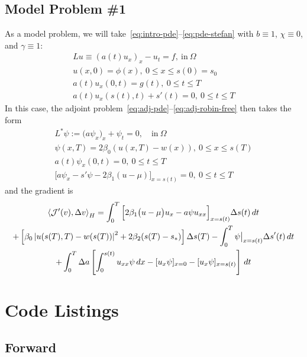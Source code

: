 \documentclass[letterpaper, 10pt]{amsart}
\theoremstyle{definition}
\theoremstyle{remark}
\newcommand{\lnorm}[1]{\left\vert #1\right\vert}%
\begin{document}
\subsection{Model Problem \#1}
As a model problem, we will take~\eqref{eq:intro-pde}--\eqref{eq:pde-stefan} with $b\equiv 1$, $\chi \equiv 0$, and $\gamma \equiv 1$:
\begin{gather}
  Lu \equiv {(a(t) u_x)}_x - u_{t} = f,~\text{in}~\Omega
  \\
  u(x,0) = \phi (x),~0 \leq x \leq s(0) = s_0
  \\
  a(t) u_x (0,t) = g(t),~0 \leq t \leq T
  \\
  a(t) u_x (s(t),t) + s'(t) = 0,~0 \leq t \leq
  T
\end{gather}
In this case, the adjoint problem~\eqref{eq:adj-pde}--\eqref{eq:adj-robin-free} then takes the form
\begin{gather}
  L^{*} \psi := \big(a \psi_x\big)_x + \psi_t = 0,\quad\text{in}~\Omega
  \\
  \psi(x, T) = 2\beta_0(u(x, T) - w(x)),~0 \leq x \leq s(T)
  \\
  a(t)\psi_x(0, t) =0,~0 \leq t \leq T
  \\
  \Big[a \psi_x - s'\psi - 2\beta_1(u - \mu)\Big]_{x=s(t)}=0, ~0 \leq t \leq T
\end{gather}
and the gradient is
\begin{gather}
  \left\langle \J'(v),\Delta v \right\rangle_H
  = \int_0^T \Big[2\beta_1\big(u - \mu\big)u_x - a \psi u_{xx} \Big]_{x=s(t)} {\Delta s}(t)\,dt \nonumber
  \\
  +
  \left[\beta_0\lnorm{u(s(T),T) - w(s(T))}^2 + 2 \beta_2 (s(T) - s_*)\right] {\Delta s}(T)
  - \int_0^T \psi \big\vert_{x=s(t)} {\Delta s}'(t) \,dt\nonumber
  \\
  + \int_0^T {\Delta a} \left[
    \int_0^{s(t)}  u_{xx} \psi \,dx
    - [u_x \psi]_{x=0}
    - [ u_x\psi]_{x=s(t)}
  \right]\,dt
\end{gather}


\appendix
\section{Code Listings}
\subsection{Forward}\label{sec:code-listing-forward}




\end{document}
